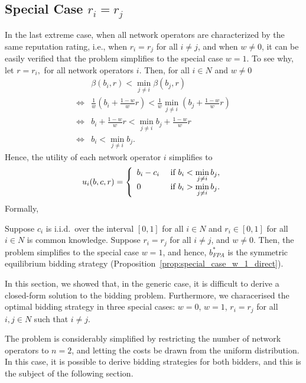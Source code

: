 \subsection{Special Case $r_i=r_j$} %
\label{sub:special_case_r_i_r_j_direct}
In the last extreme case, when all network operators are characterized by the same reputation rating, i.e., when $r_i = r_j$ for all $i\neq j$, and when $w\neq 0$, it can be easily verified that the problem simplifies to the special case $w=1$. To see why, let $r = r_i,$ for all network operators $i$. Then, for all $i\in N$ and $w\neq 0$
\begin{align*}
	&\beta(b_i, r) < \min_{j\neq i} \beta(b_j, r)\\
	\iff &\frac{1}{w} \left(b_i + \frac{1-w}{w} r\right) < \frac{1}{w} \min_{j\neq i} \left(b_j + \frac{1-w}{w} r\right)\\
	\iff &b_i + \frac{1-w}{w} r < \min_{j\neq i} b_j + \frac{1-w}{w} r\\
	\iff &b_i < \min_{j\neq i} b_j.
\end{align*}
Hence, the utility of each network operator $i$ simplifies to
\begin{equation*}
	u_i(b,c,r) = \left\{
	\begin{array}{l l}
		b_i - c_i &\text{ if } b_i < \displaystyle\min_{j\neq i} b_j,\\
		0 &\text{ if } b_i > \displaystyle\min_{j\neq i} b_j.
	\end{array}
	\right.
\end{equation*}
Formally,
\begin{corollary}
\label{cor:special_case_r_i_r_j_direct}
Suppose $c_i$ is i.i.d.~over the interval $[0,1]$ for all $i\in N$ and $r_i\in [0,1]$ for all $i\in N$ is common knowledge. Suppose $r_i = r_j$ for all $i\neq j$, and $w\neq 0$. Then, the problem simplifies to the special case $w=1$, and hence, $b^*_{FPA}$ is the symmetric equilibrium bidding strategy (Proposition~\ref{prop:special_case_w_1_direct}).
\end{corollary}

In this section, we showed that, in the generic case, it is difficult to derive a closed-form solution to the bidding problem. Furthermore, we characerised the optimal bidding strategy in three special cases: $w=0$, $w=1$, $r_i=r_j$ for all $i,j\in N$ such that $i\neq j$.

The problem is considerably simplified by restricting the number of network operators to $n=2$, and letting the costs be drawn from the uniform distribution. In this case, it is possible to derive bidding strategies for both bidders, and this is the subject of the following section.

